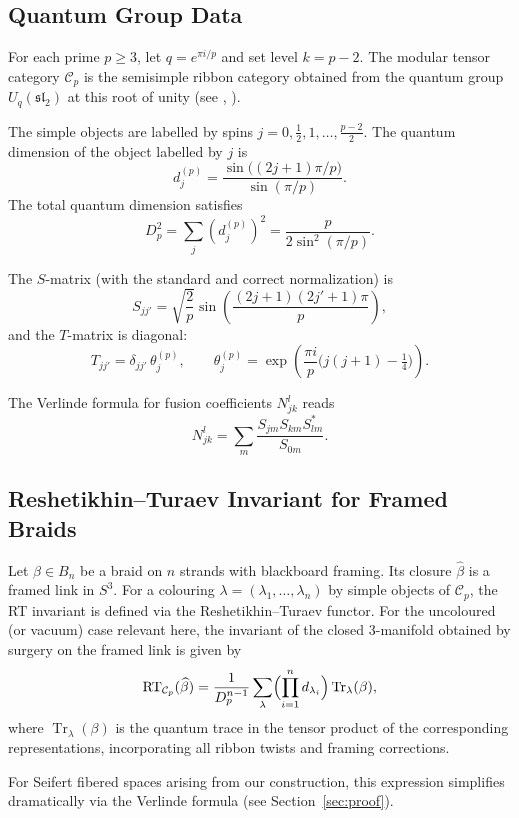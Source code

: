 \documentclass[11pt,a4paper]{amsart}
\begin{document}
\subsection{Quantum Group Data}

For each prime \(p \geq 3\), let \(q = e^{\pi i / p}\) and set level \(k = p-2\). The modular tensor category \(\mathcal{C}_p\) is the semisimple ribbon category obtained from the quantum group \(U_q(\mathfrak{sl}_2)\) at this root of unity (see \cite{RT1991}, \cite{TuraevBook}).

The simple objects are labelled by spins \(j = 0, \frac12, 1, \dots, \frac{p-2}{2}\). The quantum dimension of the object labelled by \(j\) is
\[
d_j^{(p)} = \frac{\sin\bigl( (2j+1)\pi / p \bigr)}{\sin(\pi / p)}.
\]
The total quantum dimension satisfies
\[
D_p^2 = \sum_j (d_j^{(p)})^2 = \frac{p}{2 \sin^2(\pi/p)}.
\]

The \(S\)-matrix (with the standard and correct normalization) is
\[
S_{jj'} = \sqrt{\frac{2}{p}} \sin\left( \frac{(2j+1)(2j'+1)\pi}{p} \right),
\]
and the \(T\)-matrix is diagonal:
\[
T_{jj'} = \delta_{jj'} \, \theta_j^{(p)}, \qquad \theta_j^{(p)} = \exp\left( \frac{\pi i}{p} \bigl( j(j+1) - \tfrac14 \bigr) \right).
\]

The Verlinde formula for fusion coefficients \(N_{jk}^l\) reads
\[
N_{jk}^l = \sum_m \frac{S_{jm} S_{km} S_{lm}^*}{S_{0m}}.
\]

\subsection{Reshetikhin--Turaev Invariant for Framed Braids}

Let \(\beta \in B_n\) be a braid on \(n\) strands with blackboard framing. Its closure \(\widehat{\beta}\) is a framed link in \(S^3\). For a colouring \(\lambda = (\lambda_1, \dots, \lambda_n)\) by simple objects of \(\mathcal{C}_p\), the RT invariant is defined via the Reshetikhin--Turaev functor. For the uncoloured (or vacuum) case relevant here, the invariant of the closed 3-manifold obtained by surgery on the framed link is given by
\[
\mathrm{RT}_{\mathcal{C}_p}(\widehat{\beta}) = \frac{1}{D_p^{n-1}} \sum_{\lambda} \Bigl( \prod_{i=1}^n d_{\lambda_i} \Bigr) \operatorname{Tr}_\lambda(\beta),
\]
where \(\operatorname{Tr}_\lambda(\beta)\) is the quantum trace in the tensor product of the corresponding representations, incorporating all ribbon twists and framing corrections.

For Seifert fibered spaces arising from our construction, this expression simplifies dramatically via the Verlinde formula (see Section~\ref{sec:proof}).
\end{document}
